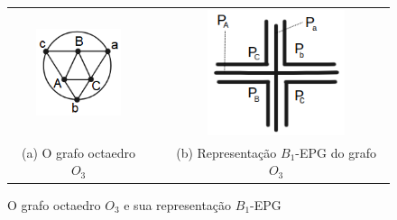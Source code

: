 \begin{figure}[h]
  \centering
  
  \begin{tabular}{@{}c@{} p{1.5cm} @{}c@{} }
   \centering \includegraphics[width=2.5cm]{./img/octaedro.png} & &\includegraphics[width=4cm]{./img/representacaoOctaedro.png}  \\[\abovecaptionskip]
    \footnotesize \centering (a) O grafo octaedro $O_3$   & &  \footnotesize(b) Representação $B_1$-EPG do grafo $O_3$
  \end{tabular}

 \caption{O grafo octaedro $O_3$ e sua representação $B_1$-EPG}\label{fig:octaedro}
\end{figure}